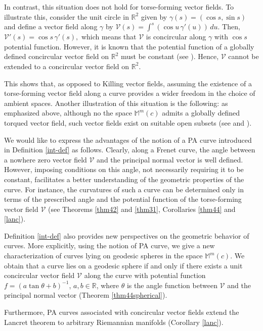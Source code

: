 \documentclass[12pt]{amsart}
\def\r{\mathbb R}
\def\m{\mathbb M}
\def\v{\mathcal V}
\theoremstyle{definition}
\begin{document}
In contrast, this situation does not hold for torse-forming vector fields. To illustrate this, consider the unit circle in $\r^2$ given by $\gamma(s)=(\cos s,\sin s)$ and define a vector field along $\gamma$ by $\v(s)=\int^{s} (\cos u \,\gamma'(u))\,du.$ Then, $\v'(s)=\cos s\,\gamma'(s),$
which means that $\v$ is concircular along $\gamma$ with $\cos s$ potential function. However, it is known that the potential function of a globally defined concircular vector field on $\r^2$ must be constant (see \cite{loy4}). Hence, $\v$ cannot be extended to a concircular vector field on $\r^2$. 

This shows that, as opposed to Killing vector fields, assuming the existence of a torse-forming vector field along a curve provides a wider freedom in the choice of ambient spaces. Another illustration of this situation is the following: as emphasized above, although no the space $\m^m(c)$ admits a globally defined torqued vector field, such vector fields exist on suitable open subsets (see \cite[Example 3.1]{amc} and \cite[Example 1]{dta}).

We would like to express the advantages of the notion of a PA curve introduced in Definition \ref{int-def} as follows. Clearly, along a Frenet curve, the angle between a nowhere zero vector field $\v$ and the principal normal vector is well defined. However, imposing conditions on this angle, not necessarily requiring it to be constant, facilitates a better understanding of the geometric properties of the curve. For instance, the curvatures of such a curve can be determined only in terms of the prescribed angle and the potential function of the torse-forming vector field $\v$ (see Theorems \ref{thm42} and \ref{thm31}, Corollaries \ref{thm44} and \ref{lanc}).

Definition \ref{int-def} also provides new perspectives on the geometric behavior of curves. More explicitly, using the notion of PA curve, we give a new characterization of curves lying on geodesic spheres in the space $\m^m(c)$. We obtain that a curve lies on a geodesic sphere if and only if there exists a unit concircular vector field $\v$ along the curve with potential function $f=(a\tan \theta +b)^{-1}$, $a,b\in\r$, where $\theta$ is  the angle function between $\v$ and the principal normal vector (Theorem \ref{thm44spherical}). 

Furthermore, PA curves associated with concircular vector fields extend the Lancret theorem to arbitrary Riemannian manifolds (Corollary \ref{lanc}).
\end{document}
